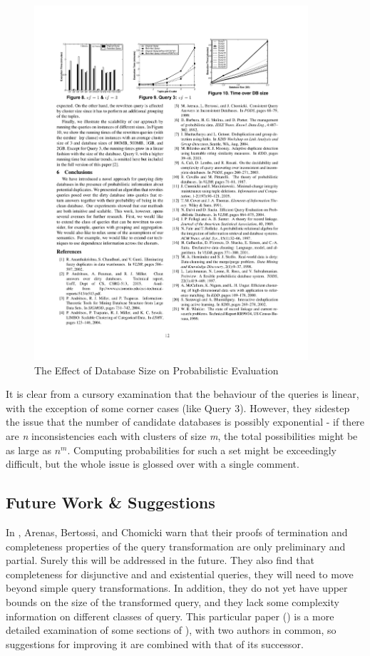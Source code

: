 \begin{figure}[!h]
  \centering \includegraphics[width=4in]{images/CAPerformance.pdf}
  \caption[The Effect of Database Size on Probabilistic Evaluation]{The Effect of Database Size on Probabilistic Evaluation \cite{CA}}
  \label{CAPerformance}
\end{figure}

It is clear from a cursory examination that the behaviour of the queries is linear, with the exception of some corner cases (like Query 3). However, they sidestep the issue that the number of candidate databases is possibly exponential - if there are \textit{n} inconsistencies each with clusters of size \textit{m}, the total possibilities might be as large as $n^{m}$. Computing probabilities for such a set might be exceedingly difficult, but the whole issue is glossed over with a single comment.

\subsection*{Future Work \& Suggestions}

In \cite{CQI}, Arenas, Bertossi, and Chomicki warn that their proofs of termination and completeness properties of the query transformation are only preliminary and partial. Surely this will be addressed in the future. They also find that completeness for disjunctive and and existential queries, they will need to move beyond simple query transformations. In addition, they do not yet have upper bounds on the size of the transformed query, and they lack some complexity information on different classes of query. This particular paper (\cite{CQI}) is a more detailed examination of some sections of \cite{CQ}), with two authors in common, so suggestions for improving it are combined with that of its successor.

